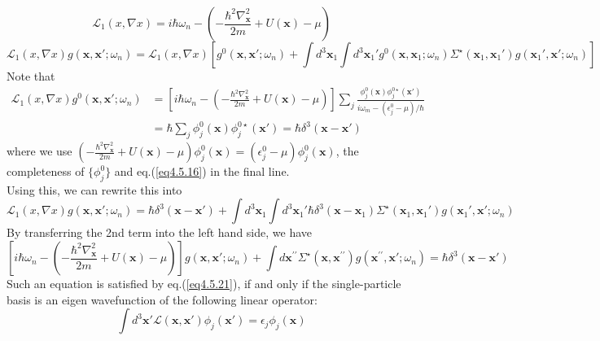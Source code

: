 \begin{equation}
\mathscr{L}_1(x,\nabla x)=i\hbar \omega_n - \left( -\frac{\hbar^2\nabla^2_\mathbf{x}}{2m}+U(\mathbf{x})-\mu\right)
\end{equation}
\[
\mathscr{L}_1(x,\nabla x) g(\mathbf{x},\mathbf{x}';\omega_n)=\mathscr{L}_1(x,\nabla x) \left[ g^0(\mathbf{x},\mathbf{x}';\omega_n)+\int d^3\mathbf{x}_1 \int d^3\mathbf{x}_1' g^0(\mathbf{x},\mathbf{x}_1;\omega_n)\Sigma^\star (\mathbf{x}_1,\mathbf{x}_1')g(\mathbf{x}_1',\mathbf{x}';\omega_n)\right]
\]
Note that
\begin{equation}\label{eq4.5.24}
\begin{aligned}
\mathscr{L}_1(x,\nabla x) g^0(\mathbf{x},\mathbf{x}';\omega_n)
&=\left[i\hbar \omega_n - \left( -\frac{\hbar^2\nabla^2_\mathbf{x}}{2m}+U(\mathbf{x})-\mu\right) \right] \sum_j \frac{\phi_j^0(\mathbf{x})\phi_j^{0\star}(\mathbf{x'})}{i\omega_m-(\epsilon_j^0-\mu)/\hbar}\\
&=\hbar \sum_j \phi_j^0(\mathbf{x})\phi_j^{0\star}(\mathbf{x'})=\hbar \delta^3 (\mathbf{x}-\mathbf{x}')
\end{aligned}
\end{equation}
where we use $\left( -\frac{\hbar^2\nabla^2_\mathbf{x}}{2m}+U(\mathbf{x})-\mu\right)\phi_j^0 (\mathbf{x})=(\epsilon_j^0-\mu) \phi_j^0(\mathbf{x})$, the completeness of $\{ \phi_j^0\}$ and eq.(\ref{eq4.5.16}) in the final line.\\
Using this, we can rewrite this into
\begin{equation}
\mathscr{L}_1(x,\nabla x) g(\mathbf{x},\mathbf{x}';\omega_n)=\hbar \delta^3(\mathbf{x}-\mathbf{x}')+\int d^3\mathbf{x}_1\int d^3\mathbf{x}_1'\hbar \delta^3(\mathbf{x}-\mathbf{x}_1)\Sigma^\star (\mathbf{x}_1,\mathbf{x}_1')g(\mathbf{x}_1',\mathbf{x}';\omega_n)
\end{equation}
By transferring the 2nd term into the left hand side, we have
\begin{equation}\label{eq4.5.26}
\left[i\hbar \omega_n - \left( -\frac{\hbar^2\nabla^2_\mathbf{x}}{2m}+U(\mathbf{x})-\mu\right) \right] g(\mathbf{x},\mathbf{x}';\omega_n)+\int d \mathbf{x}^{\prime \prime} \Sigma^\star (\mathbf{x},\mathbf{x}^{\prime\prime})g(\mathbf{x}^{\prime\prime},\mathbf{x}';\omega_n)=\hbar \delta^3(\mathbf{x}-\mathbf{x}')
\end{equation}
Such an equation is satisfied by eq.(\ref{eq4.5.21}), if and only if the single-particle basis is an eigen wavefunction of the following linear operator:
\begin{equation}\label{eq4.5.27}
\int d^3 \mathbf{x}' \mathscr{L}(\mathbf{x},\mathbf{x}')\phi_j(\mathbf{x}')=\epsilon_j\phi_j(\mathbf{x})
\end{equation}
